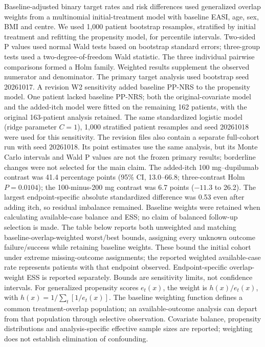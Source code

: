 Baseline-adjusted binary target rates and risk differences used generalized overlap weights from a multinomial initial-treatment model with baseline EASI, age, sex, BMI and centre. We used 1,000 patient bootstrap resamples, stratified by initial treatment and refitting the propensity model, for percentile intervals. Two-sided P values used normal Wald tests based on bootstrap standard errors; three-group tests used a two-degree-of-freedom Wald statistic. The three individual pairwise comparisons formed a Holm family. Weighted results supplement the observed numerator and denominator. The primary target analysis used bootstrap seed 20261017. A revision W2 sensitivity added baseline PP-NRS to the propensity model. One patient lacked baseline PP-NRS; both the original-covariate model and the added-itch model were fitted on the remaining 162 patients, with the original 163-patient analysis retained. The same standardized logistic model (ridge parameter $C=1$), 1,000 stratified patient resamples and seed 20261018 were used for this sensitivity. The revision files also contain a separate full-cohort run with seed 20261018. Its point estimates use the same analysis, but its Monte Carlo intervals and Wald P values are not the frozen primary results; borderline changes were not selected for the main claim. The added-itch 100 mg--dupilumab contrast was 41.4 percentage points (95\% CI, 13.0--66.8; three-contrast Holm $P=0.0104$); the 100-minus-200 mg contrast was 6.7 points ($-11.3$ to 26.2). The largest endpoint-specific absolute standardized difference was 0.53 even after adding itch, so residual imbalance remained. Baseline weights were retained when calculating available-case balance and ESS; no claim of balanced follow-up selection is made. The table below reports both unweighted and matching baseline-overlap-weighted worst/best bounds, assigning every unknown outcome failure/success while retaining baseline weights. These bound the initial cohort under extreme missing-outcome assignments; the reported weighted available-case rate represents patients with that endpoint observed. Endpoint-specific overlap-weight ESS is reported separately. Bounds are sensitivity limits, not confidence intervals.
 For generalized propensity scores $e_t(x)$, the weight is $h(x)/e_t(x)$, with $h(x)=1/\sum_t[1/e_t(x)]$. The baseline weighting function defines a common treatment-overlap population; an available-outcome analysis can depart from that population through selective observation. Covariate balance, propensity distributions and analysis-specific effective sample sizes are reported; weighting does not establish elimination of confounding.\citep{lili2019}

